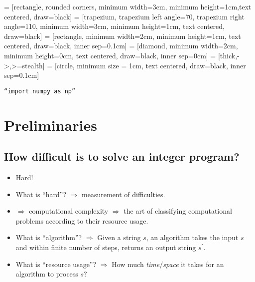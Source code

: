 
\usepackage{makecell}
\usepackage{float}

\usetikzlibrary{shapes.geometric, arrows}
     = [rectangle, rounded corners, minimum width=3cm, minimum height=1cm,text centered, draw=black]
     = [trapezium, trapezium left angle=70, trapezium right angle=110, minimum width=3cm, minimum height=1cm, text centered, draw=black]
     = [rectangle, minimum width=2cm, minimum height=1cm, text centered, draw=black, inner sep=0.1cm]
     = [diamond, minimum width=2cm, minimum height=0cm, text centered, draw=black, inner sep=0cm]
     = [thick,->,>=stealth]
     = [circle, minimum size = 1cm, text centered, draw=black, inner sep=0.1cm]

\renewcommand{\docTitle}{Lecture 2 - Computational Complexity and Algorithm Design}
\renewcommand{\docAuthor}{Lan Peng, Ph.D.}
\renewcommand{\docAffil}{School of Management, Shanghai University, Shanghai, China}

    \titleSec

    \begin{center}
        \texttt{``import numpy as np''}
    \end{center}

    \section{Preliminaries}
        \subsection{How difficult is to solve an integer program?}
            \begin{itemize}
                \item Hard!
                \item What is ``hard''? $\Rightarrow$ measurement of difficulties.
                \item $\Rightarrow$ computational complexity $\Rightarrow$ the art of classifying computational problems according to their resource usage.
                \item What is ``algorithm''? $\Rightarrow$ Given a string $s$, an algorithm takes the input $s$ and within finite number of steps, returns an output string $s^\prime$.
                \item What is ``resource usage''? $\Rightarrow$ How much \textit{time}/\textit{space} it takes for an algorithm to process $s$?
            \end{itemize}

